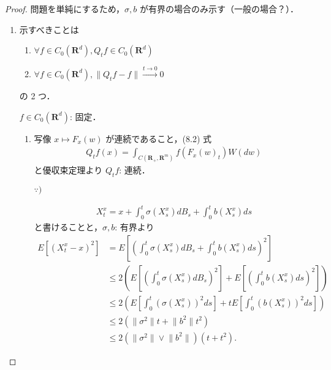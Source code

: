 \documentclass{jsarticle}
\begin{document}
\begin{proof}
    問題を単純にするため，$\sigma, b$ が有界の場合のみ示す（一般の場合？）．
    \begin{enumerate}[label=(\arabic*)]
        \item
        示すべきことは
        \begin{enumerate}[label=(\roman*)]
            \item
            $\forall f\in C_{0}(\mathbf{R}^d), Q_{t}f\in C_{0}(\mathbf{R}^d)$
            \item
            $\forall f\in C_{0}(\mathbf{R}^d), \lVert Q_{t}f-f\rVert\xrightarrow{t\to0}0$
        \end{enumerate}
        の 2 つ．

        $f\in C_{0}(\mathbf{R}^d)$: 固定．
        \begin{enumerate}[label=(\roman*)]
            \item
            写像 $x\mapsto F_{x}(w)$ が連続であること，(8.2) 式
            \begin{align}
                Q_{t}f(x)
                = \int_{C(\mathbf{R_+}, \mathbf{R}^{m})}f(F_{x}(w)_{t})W(dw)
            \end{align}
            と優収束定理より $Q_{t}f$: 連続\nazo．
            
            \begin{screen}
                $\because)$
            \end{screen}
            \begin{align}
                X_{t}^{x}
                = x
                + \int_{0}^{t}\sigma(X_{s}^{x})dB_{s}
                + \int_{0}^{t}b(X_{s}^{x})ds
            \end{align}
            と書けることと，$\sigma, b$: 有界より
            \begin{align}
                E[(X_{t}^{x}-x)^2]
                &= E[(\int_{0}^{t}\sigma(X_{s}^{x})dB_{s}
                + \int_{0}^{t}b(X_{s}^{x})ds)^2] \\
                &\le 2(E[(\int_{0}^{t}\sigma(X_{s}^{x})dB_{s})^2]
                + E[(\int_{0}^{t}b(X_{s}^{x})ds)^2]) \\
                &\le 2(E[\int_{0}^{t}(\sigma(X_{s}^{x}))^{2}ds]
                + tE[\int_{0}^{t}(b(X_{s}^{x}))^{2}ds]) \\
                &\le 2(\lVert \sigma^2\rVert t+\lVert b^2\rVert t^2) \\
                &\le 2(\lVert \sigma^2\rVert\vee\lVert b^2\rVert)(t+t^2).
            \end{align}


\end{enumerate}
\end{enumerate}
\end{proof}
\end{document}
